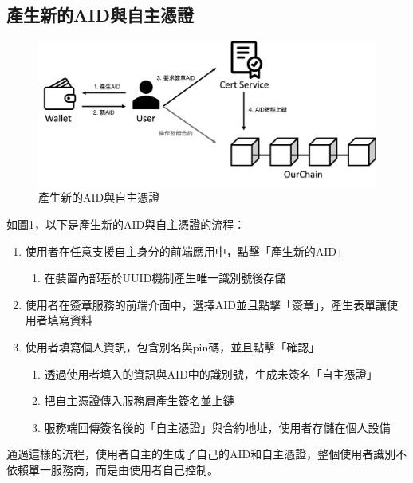 \subsection{產生新的AID與自主憑證}
\begin{figure}
  \centering
  \includegraphics[width=\linewidth, keepaspectratio]{figures/implement-1.png}
  \caption{產生新的AID與自主憑證}
  \label{fig:implement-1}
\end{figure}
如圖\ref{fig:implement-1}，以下是產生新的AID與自主憑證的流程：
\begin{enumerate}
  \item 使用者在任意支援自主身分的前端應用中，點擊「產生新的AID」
        \begin{enumerate}
          \item 在裝置內部基於UUID機制產生唯一識別號後存儲
        \end{enumerate}
  \item 使用者在簽章服務的前端介面中，選擇AID並且點擊「簽章」，產生表單讓使用者填寫資料
  \item 使用者填寫個人資訊，包含別名與pin碼，並且點擊「確認」
        \begin{enumerate}
          \item 透過使用者填入的資訊與AID中的識別號，生成未簽名「自主憑證」
          \item 把自主憑證傳入服務層產生簽名並上鏈
          \item 服務端回傳簽名後的「自主憑證」與合約地址，使用者存儲在個人設備
        \end{enumerate}
\end{enumerate}
通過這樣的流程，使用者自主的生成了自己的AID和自主憑證，整個使用者識別不依賴單一服務商，而是由使用者自己控制。
